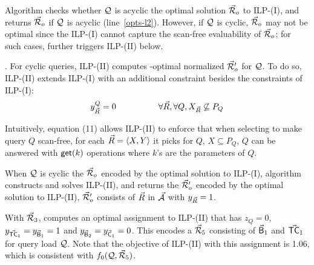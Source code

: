 \vspace{0.8ex}
Algorithm \opts checks whether $\mathcal Q$ is acyclic \wrt the optimal
solution $\vec{{\mathcal R}}_{o}$ to ILP-(I), and returns $\vec{{\mathcal R}}_{o}$ 
if $\mathcal Q$ is acyclic (line~\ref{opts-l2}). However, if $\mathcal Q$ is
cyclic, $\vec{{\mathcal R}}_{o}$ may not be optimal since the ILP-(I) cannot
capture the scan-free evaluability of $\vec{{\mathcal R}}_{o}$;
for such cases, \opts further triggers ILP-(II) below.


\vspace{0.36ex}

.
For cyclic queries,
ILP-(II) computes %
\ssf-optimal normalized \bds $\vec{{\mathcal R}}_{o}'$ for $\mathcal Q$. 
To do so, ILP-(II) %
extends ILP-(I) with an additional constraint besides the constraints
of ILP-(I):
\vspace{-0.7ex}
\begin{alignat}{2}                                                       
&  y_{\vec{R}}^{Q} = 0 &~~~~~~~~~~~~\forall \vec{R}, \forall Q, X_{\vec{R}}\not\subseteq P_{Q}
\end{alignat}                                                            

\vspace{-0.7ex}

Intuitively, equation (11) allows ILP-(II) to enforce that when
selecting \bss to make query $Q$ scan-free, for each
\bs $\vec{R} \allowbreak = \allowbreak \langle X,\allowbreak Y\rangle$ it picks for $Q$, $X\subseteq
P_{Q}$, \ie $Q$ can be answered with $\protect\mathsf{get}(k)$ operations where
$k$'s are the parameters of $Q$.


\vspace{0.36ex}
When $\mathcal Q$ is cyclic \wrt the \bds $\vec{{\mathcal R}}_{o}$ encoded by the
optimal solution to ILP-(I), algorithm \opts constructs and solves
ILP-(II), and returns the \bds $\vec{{\mathcal R}}_{o}'$ encoded by the
optimal solution to ILP-(II), \ie $\vec{{\mathcal R}}_{o}'$ consists of \bss
$\vec{R}$ in $\vec{{\mathcal A}}$ with $y_{\vec{R}} = 1$. 

\begin{example}\label{exa-ILP-II}
With $\vec{{\mathcal R}}_{3}$, \opts computes an optimal assignment to
ILP-(II) that has $z_{Q} = 0$, %
$y_{\vec{\protect\mathsf{TC}}_{1}} = y_{\vec{\protect\mathsf{B}}_{1}} = 1$ and
$y_{\vec{\protect\mathsf{B}}_{2}} = y_{\vec{\protect\mathsf{C}}_{1}} = 0$. %
This encodes a
\bds $\vec{{\mathcal R}}_{5}$ consisting of $\vec{\protect\mathsf{B}}_{1}$ and
$\vec{\protect\mathsf{TC}}_{1}$ for query load $\mathcal Q$. Note that the objective of ILP-(II)
with this assignment is 1.06, which is consistent with $f_{0}(\mathcal Q,
\vec{{\mathcal R}}_{5})$. 
\end{example}

